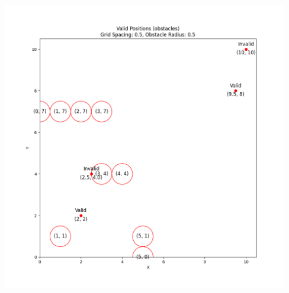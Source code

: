 \documentclass{article}
\begin{document}
    \begin{center}
    \includegraphics[height=5in]{HW2P1 Valid Positions.png}
    \end{center}
\end{document}
